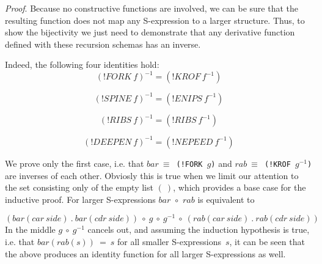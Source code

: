 \documentclass[11pt]{article} %
\newcommand{\eeq}{\end{equation}}
\newcommand{\beql}[1]{\begin{equation}\label{#1}}
\newcommand{\scmcodeintext}[1]{{\tt{#1}}}
\newcommand{\nilatom}{\ensuremath{\mathbf{(~)}}\xspace}
\newcommand{\funapply}{\ensuremath{\circ}}
\begin{document}
\textit{Proof}. Because no constructive functions are involved, we can be
sure that the resulting function does not map any S-expression
to a larger structure. Thus, to show the bijectivity we just
need to demonstrate that any derivative function defined with
these recursion schemas has an inverse.


Indeed, the following four identities hold:
\beql{Inverse_of_FORK_f}
(!FORK~f)^{-1} = (!KROF~f^{-1})
\eeq

\beql{Inverse_of_SPINE_f}
(!SPINE~f)^{-1} = (!ENIPS~f^{-1})
\eeq

\beql{Inverse_of_RIBS_f}
(!RIBS~f)^{-1} = (!RIBS~f^{-1})
\eeq

\beql{Inverse_of_DEEPEN_f}
(!DEEPEN~f)^{-1} = (!NEPEED~f^{-1})
\eeq



We prove only the first case, i.e. that
$bar~\equiv$~\scmcodeintext{(!FORK~$g$)} and
$rab~\equiv$~\scmcodeintext{(!KROF~$g^{-1}$)}
are inverses of each other.
Obviosly this is true when we limit our attention to the set consisting
only of the empty list \nilatom, which provides a base case
for the inductive proof.
For larger S-expressions $bar$~\funapply~$rab$ is equivalent to

\beql{Eq1.1}
(bar(car~side)~.~bar(cdr~side))~\funapply~g~\funapply~g^{-1}~\funapply~(rab(car~side)~.~rab(cdr~side))
\eeq
In the middle $g~\funapply~g^{-1}$ cancels out, and assuming the
induction hypothesis is true, i.e. that $bar(rab(s))~=~s$ for all
smaller S-expressions~$s$,
it can be seen that the above produces an identity function for
all larger S-expressions as well.
\end{document}
